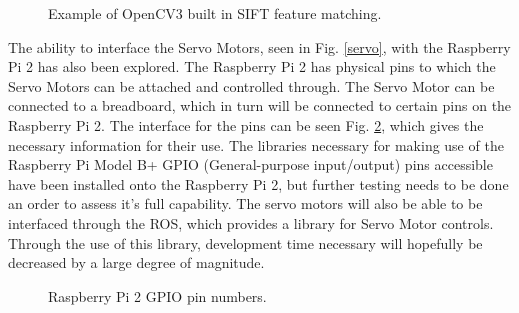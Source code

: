 \documentclass[letterpaper, 10 pt, conference]{ieeeconf}
\begin{document}
\begin{figure}[!h]
\centering
{}
\caption{Example of OpenCV3 built in SIFT feature matching.}
\label{OBJ_REC}
\end{figure}


The ability to interface the Servo Motors, seen in Fig. \ref{servo}, with the Raspberry Pi 2 has also been explored.  The Raspberry Pi 2 has physical pins to which the Servo Motors can be attached and controlled through.  The Servo Motor can be connected to a breadboard, which in turn will be connected to certain pins on the Raspberry Pi 2.  The interface for the pins can be seen Fig. \ref{PIN_RP2}, which gives the necessary information for their use. The libraries necessary for making use of the Raspberry Pi Model B+ GPIO (General-purpose input/output) pins accessible have been installed onto the Raspberry Pi 2, but further testing needs to be done an order to assess it's full capability. The servo motors will also be able to be interfaced through the ROS, which provides a library for Servo Motor controls.  Through the use of this library, development time necessary will hopefully be decreased by a large degree of magnitude.

\begin{figure}[!h]
\centering
{}
\caption{Raspberry Pi 2 GPIO pin numbers.}
\label{PIN_RP2}
\end{figure}
\end{document}
